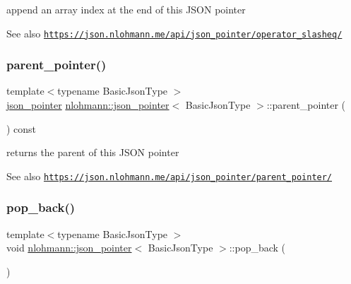 append an array index at the end of this J\+S\+ON pointer 

\begin{DoxySeeAlso}{See also}
\href{https://json.nlohmann.me/api/json_pointer/operator_slasheq/}{\tt https\+://json.\+nlohmann.\+me/api/json\+\_\+pointer/operator\+\_\+slasheq/} 
\end{DoxySeeAlso}
\mbox{\label{classnlohmann_1_1json__pointer_afdaacce1edb7145e0434e014f0e8685a}} 
\subsubsection{\texorpdfstring{parent\+\_\+pointer()}{parent\_pointer()}}
{\footnotesize\ttfamily template$<$typename Basic\+Json\+Type $>$ \\
\hyperlink{classnlohmann_1_1json__pointer}{json\+\_\+pointer} \hyperlink{classnlohmann_1_1json__pointer}{nlohmann\+::json\+\_\+pointer}$<$ Basic\+Json\+Type $>$\+::parent\+\_\+pointer (\begin{DoxyParamCaption}{ }\end{DoxyParamCaption}) const\hspace{0.3cm}{\ttfamily [inline]}}



returns the parent of this J\+S\+ON pointer 

\begin{DoxySeeAlso}{See also}
\href{https://json.nlohmann.me/api/json_pointer/parent_pointer/}{\tt https\+://json.\+nlohmann.\+me/api/json\+\_\+pointer/parent\+\_\+pointer/} 
\end{DoxySeeAlso}
\mbox{\label{classnlohmann_1_1json__pointer_a4b1ee4d511ca195bed896a3da47e264c}} 
\subsubsection{\texorpdfstring{pop\+\_\+back()}{pop\_back()}}
{\footnotesize\ttfamily template$<$typename Basic\+Json\+Type $>$ \\
void \hyperlink{classnlohmann_1_1json__pointer}{nlohmann\+::json\+\_\+pointer}$<$ Basic\+Json\+Type $>$\+::pop\+\_\+back (\begin{DoxyParamCaption}{ }\end{DoxyParamCaption})\hspace{0.3cm}{\ttfamily [inline]}}



